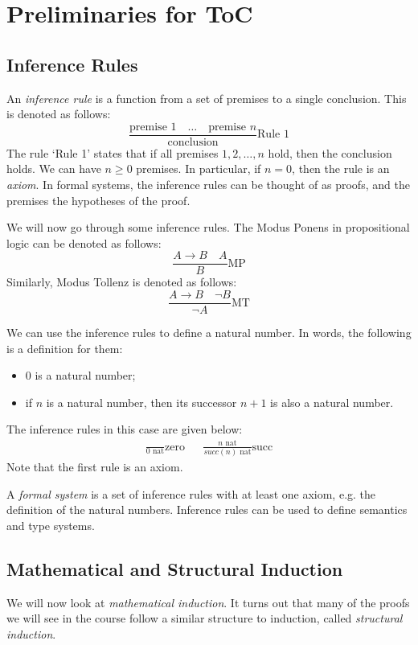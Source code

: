 \documentclass[a4paper, openany]{memoir}
\begin{document}
    \chapter{Preliminaries for ToC}

    \section{Inference Rules}
    An \emph{inference rule} is a function from a set of premises to a single conclusion. This is denoted as follows:
    \[\frac{\textrm{premise 1} \quad \dots \quad \textrm{premise } n}{\textrm{conclusion}} \textrm{Rule } 1\]
    The rule `Rule 1' states that if all premises $1, 2, \dots, n$ hold, then the conclusion holds. We can have $n \geq 0$ premises. In particular, if $n = 0$, then the rule is an \emph{axiom}. In formal systems, the inference rules can be thought of as proofs, and the premises the hypotheses of the proof.

    We will now go through some inference rules. The Modus Ponens in propositional logic can be denoted as follows:
    \[\frac{A \to B \quad A}{B} \textrm{MP}\]
    Similarly, Modus Tollenz is denoted as follows:
    \[\frac{A \to B \quad \lnot B}{\lnot A} \textrm{MT}\]

    We can use the inference rules to define a natural number. In words, the following is a definition for them:
    \begin{itemize}
        \item $0$ is a natural number;
        \item if $n$ is a natural number, then its successor $n+1$ is also a natural number.
    \end{itemize}
    The inference rules in this case are given below:
    \begin{align*}
        \frac{}{0 \textrm{ nat}} \textrm{zero} & & \frac{n \textrm{ nat}}{\textit{succ}(n) \textrm{ nat}} \textrm{succ}
    \end{align*}
    Note that the first rule is an axiom.

    A \emph{formal system} is a set of inference rules with at least one axiom, e.g. the definition of the natural numbers. Inference rules can be used to define semantics and type systems.
    \newpage

    \section{Mathematical and Structural Induction}
    We will now look at \emph{mathematical induction}. It turns out that many of the proofs we will see in the course follow a similar structure to induction, called \emph{structural induction}.
\end{document}
